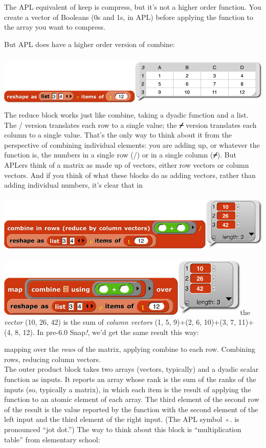 The APL equivalent of keep is compress, but it's not a higher order
function. You create a vector of Booleans (0s and 1s, in APL) before
applying the function to the array you want to compress.

But APL does have a higher order version of combine:

\includegraphics[width=6.68333in,height=1.04167in]{media/image1332.png}The
reduce block works just like combine, taking a dyadic function and a
list. The / version translates each row to a single value; the
\textbf{⌿} version translates each column to a single value. That's the
only way to think about it from the perspective of combining individual
elements: you are adding up, or whatever the function is, the numbers in
a single row (/) or in a single column (\textbf{⌿}). But APLers think of
a matrix as made up of vectors, either row vectors or column vectors.
And if you think of what these blocks do as adding vectors, rather than
adding individual numbers, it's clear that in

\includegraphics[width=5.83333in,height=1.1in]{media/image1333.png}

\includegraphics[width=4.80833in,height=1.1in]{media/image1334.png}the
\emph{vector} (10, 26, 42) is the sum of \emph{column vectors} (1, 5,
9)+(2, 6, 10)+(3, 7, 11)+(4, 8, 12). In pre-6.0 Snap\emph{!}, we'd get
the same result this way:

mapping over the \emph{rows} of the matrix, applying combine to each
row. Combining rows, reducing column vectors.\\
The outer product block takes two arrays (vectors, typically) and a
dyadic scalar function as inputs. It reports an array whose rank is the
sum of the ranks of the inputs (so, typically a matrix), in which each
item is the result of applying the function to an atomic element of each
array. The third element of the second row of the result is the value
reported by the function with the second element of the left input and
the third element of the right input. (The APL symbol ◦. is pronounced
``jot dot.'') The way to think about this block is ``multiplication
table'' from elementary school:

